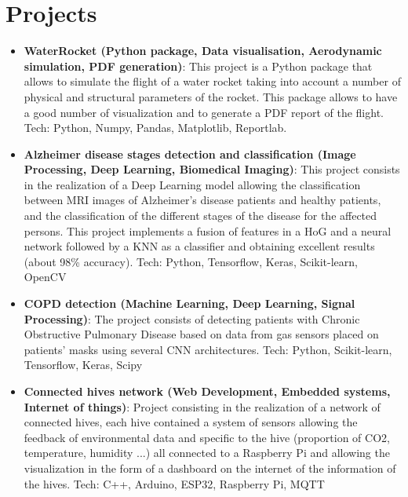 \documentclass[a4paper,20pt]{article}
\newcommand{\resumeItem}[2]{
  \item\small{
    \textbf{#1}{: #2 \vspace{-2pt}}
  }
}
\newcommand{\resumeSubItem}[2]{\resumeItem{#1}{#2}\vspace{-3pt}}
\newcommand{\resumeSubHeadingListStart}{\begin{itemize}[leftmargin=*]}
\newcommand{\resumeSubHeadingListEnd}{\end{itemize}}
\begin{document}
\vspace{-5pt}
\section{Projects}
  \resumeSubHeadingListStart
    \resumeSubItem{WaterRocket (Python package, Data visualisation, Aerodynamic simulation, PDF generation)}{This project is a Python package that allows to simulate the flight of a water rocket taking into account a number of physical and structural parameters of the rocket. This package allows to have a good number of visualization and to generate a PDF report of the flight. Tech: Python, Numpy, Pandas, Matplotlib, Reportlab.}
    \vspace{2pt}
    \resumeSubItem{Alzheimer disease stages detection and classification (Image Processing, Deep Learning, Biomedical Imaging)}{This project consists in the realization of a Deep Learning model allowing the classification between MRI images of Alzheimer's disease patients and healthy patients, and the classification of the different stages of the disease for the affected persons. This project implements a fusion of features in a HoG and a neural network followed by a KNN as a classifier and obtaining excellent results (about 98\% accuracy). Tech: Python, Tensorflow, Keras, Scikit-learn, OpenCV}
    \vspace{2pt}
    \resumeSubItem{COPD detection (Machine Learning, Deep Learning, Signal Processing)}{The project consists of detecting patients with Chronic Obstructive Pulmonary Disease based on data from gas sensors placed on patients' masks using several CNN architectures. Tech: Python, Scikit-learn, Tensorflow, Keras, Scipy}
    \vspace{2pt}
    \resumeSubItem{Connected hives network (Web Development, Embedded systems, Internet of things)}{Project consisting in the realization of a network of connected hives, each hive contained a system of sensors allowing the feedback of environmental data and specific to the hive (proportion of CO2, temperature, humidity ...) all connected to a Raspberry Pi and allowing the visualization in the form of a dashboard on the internet of the information of the hives. Tech: C++, Arduino, ESP32, Raspberry Pi, MQTT}
  \resumeSubHeadingListEnd
\vspace{-5pt}
\end{document}
